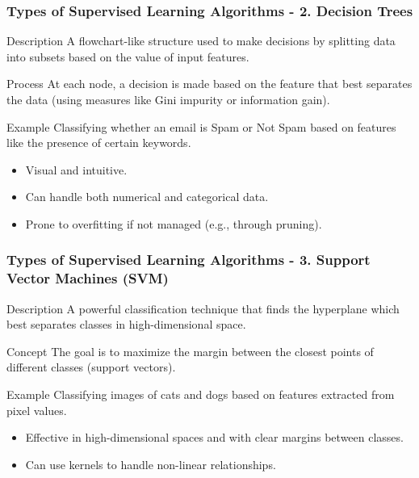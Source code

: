 \documentclass[aspectratio=169]{beamer}
\begin{document}
\begin{frame}[fragile]
    \frametitle{Types of Supervised Learning Algorithms - 2. Decision Trees}
    \begin{block}{Description}
        A flowchart-like structure used to make decisions by splitting data into subsets based on the value of input features.
    \end{block}

    \begin{block}{Process}
        At each node, a decision is made based on the feature that best separates the data (using measures like Gini impurity or information gain).
    \end{block}

    \begin{block}{Example}
        Classifying whether an email is Spam or Not Spam based on features like the presence of certain keywords.
    \end{block}

    \begin{itemize}
        \item Visual and intuitive.
        \item Can handle both numerical and categorical data.
        \item Prone to overfitting if not managed (e.g., through pruning).
    \end{itemize}
\end{frame}

\begin{frame}[fragile]
    \frametitle{Types of Supervised Learning Algorithms - 3. Support Vector Machines (SVM)}
    \begin{block}{Description}
        A powerful classification technique that finds the hyperplane which best separates classes in high-dimensional space.
    \end{block}

    \begin{block}{Concept}
        The goal is to maximize the margin between the closest points of different classes (support vectors).
    \end{block}

    \begin{block}{Example}
        Classifying images of cats and dogs based on features extracted from pixel values.
    \end{block}

    \begin{itemize}
        \item Effective in high-dimensional spaces and with clear margins between classes.
        \item Can use kernels to handle non-linear relationships.
    \end{itemize}
\end{frame}
\end{document}
